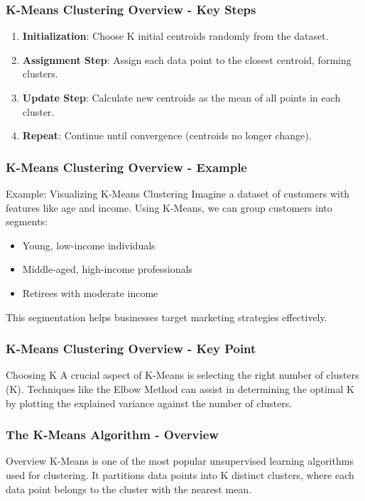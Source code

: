 \documentclass[aspectratio=169]{beamer}
\begin{document}
\begin{frame}[fragile]
    \frametitle{K-Means Clustering Overview - Key Steps}
    \begin{enumerate}
        \item \textbf{Initialization}: Choose K initial centroids randomly from the dataset.
        \item \textbf{Assignment Step}: Assign each data point to the closest centroid, forming clusters.
        \item \textbf{Update Step}: Calculate new centroids as the mean of all points in each cluster.
        \item \textbf{Repeat}: Continue until convergence (centroids no longer change).
    \end{enumerate}
\end{frame}

\begin{frame}[fragile]
    \frametitle{K-Means Clustering Overview - Example}
    \begin{block}{Example: Visualizing K-Means Clustering}
        Imagine a dataset of customers with features like age and income. Using K-Means, we can group customers into segments:
        \begin{itemize}
            \item Young, low-income individuals
            \item Middle-aged, high-income professionals
            \item Retirees with moderate income
        \end{itemize}
        This segmentation helps businesses target marketing strategies effectively.
    \end{block}
\end{frame}

\begin{frame}[fragile]
    \frametitle{K-Means Clustering Overview - Key Point}
    \begin{block}{Choosing K}
        A crucial aspect of K-Means is selecting the right number of clusters (K). Techniques like the Elbow Method can assist in determining the optimal K by plotting the explained variance against the number of clusters.
    \end{block}
\end{frame}

\begin{frame}[fragile]
    \frametitle{The K-Means Algorithm - Overview}
    \begin{block}{Overview}
        K-Means is one of the most popular unsupervised learning algorithms used for clustering. 
        It partitions data points into K distinct clusters, where each data point belongs to the cluster with the nearest mean.
    \end{block}
\end{frame}
\end{document}
